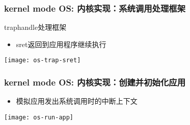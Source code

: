 \begin{frame}
    \frametitle{kernel mode OS: 内核实现：系统调用处理框架}
    trap\-handle处理框架
    \begin{itemize}
        \item sret返回到应用程序继续执行
    \end{itemize}	
    \centering
    \texttt{[image: os-trap-sret]}
\end{frame}

\begin{frame}
    \frametitle{kernel mode OS: 内核实现：创建并初始化应用}

    \begin{itemize}
        \item 模拟应用发出系统调用时的中断上下文
    \end{itemize}	
    \centering
    \texttt{[image: os-run-app]}
\end{frame}

